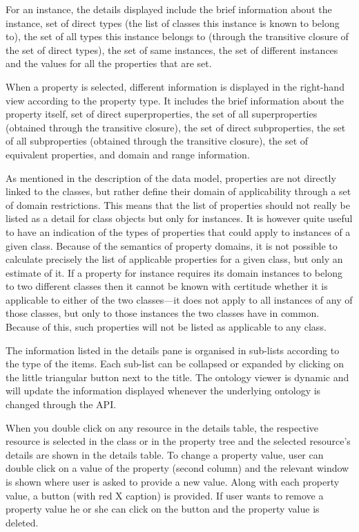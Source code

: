{For an instance, the details displayed include the brief information about the
instance, set of direct types (the list of classes this instance is known to
belong to), the set of all types this instance belongs to (through the
transitive closure of the set of direct types), the set of same instances, the
set of different instances and the values for all the properties that are set.

When a property is selected, different information is displayed in the right-hand
view according to the property type. It includes the brief information about the
property itself, set of direct superproperties, the set of all superproperties
(obtained through the transitive closure), the set of direct subproperties, the
set of all subproperties (obtained through the transitive closure), the set of
equivalent properties, and domain and range information.

As mentioned in the description of the data model, properties are not directly
linked to the classes, but rather define their domain of applicability through a
set of domain restrictions. This means that the list of properties should not
really be listed as a detail for class objects but only for instances. It is
however quite useful to have an indication of the types of properties that could
apply to instances of a given class. Because of the semantics of property
domains, it is not possible to calculate precisely the list of applicable
properties for a given class, but only an estimate of it. If a property for
instance requires its domain instances to belong to two different classes then
it cannot be known with certitude whether it is applicable to either of the two
classes---it does not apply to all instances of any of those classes, but only
to those instances the two classes have in common. Because of this, such
properties will not be listed as applicable to any class. 

The information listed in the details pane is organised in sub-lists according
to the type of the items. Each sub-list can be collapsed or expanded by
clicking on the little triangular button next to the title. The ontology viewer
is dynamic and will update the information displayed whenever the underlying
ontology is changed through the API.

When you double click on any resource in the details table, the respective
resource is selected in the class or in the property tree and the selected
resource's details are shown in the details table. To change a
property value, user can double click on a value of the property (second column)
and the relevant window is shown where user is asked to provide a new value.
Along with each property value, a button (with red X caption) is provided.
If user wants to remove a property value he or she can click on the button and
the property value is deleted.

}

